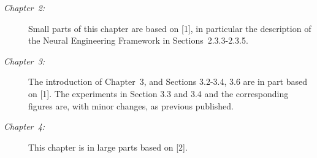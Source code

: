 \begin{description}
	\item[\normalfont\emph{Chapter~2:}] Small parts of this chapter are based on [1], in particular the description of the Neural Engineering Framework in Sections~2.3.3-2.3.5.
	\item[\normalfont\emph{Chapter~3:}] The introduction of Chapter~3, and Sections 3.2-3.4, 3.6 are in part based on [1].
	The experiments in Section 3.3 and 3.4 and the corresponding figures are, with minor changes, as previous published.
	\item[\normalfont\emph{Chapter~4:}] This chapter is in large parts based on [2].
\end{description}

\clearpage
